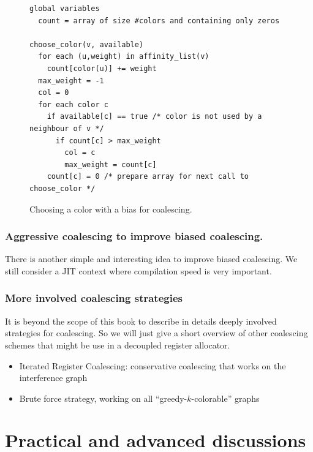 {\begin{figure}
  \begin{verbatim}
global variables
  count = array of size #colors and containing only zeros

choose_color(v, available)
  for each (u,weight) in affinity_list(v)
    count[color(u)] += weight
  max_weight = -1
  col = 0
  for each color c
    if available[c] == true /* color is not used by a neighbour of v */
      if count[c] > max_weight
        col = c
        max_weight = count[c]
    count[c] = 0 /* prepare array for next call to choose_color */
  \end{verbatim}
  \caption{Choosing a color with a bias for coalescing.}
  \label{code:choose-color}
\end{figure}


\subsubsection{Aggressive coalescing to improve biased coalescing.}

There is another simple and interesting idea to improve biased coalescing. We 
still consider a JIT context where compilation speed is very important.


\subsubsection{More involved coalescing strategies}

It is beyond the scope of this book to describe in details deeply involved strategies for coalescing.
So we will just give a short overview of other coalescing schemes that might be use in a decoupled register allocator.
\begin{itemize}
  \item Iterated Register Coalescing: conservative coalescing that works on the interference graph
  \item Brute force strategy, working on all ``greedy-$k$-colorable'' graphs
\end{itemize}




\section{Practical and advanced discussions}
\label{sec:practical-regalloc}


}
